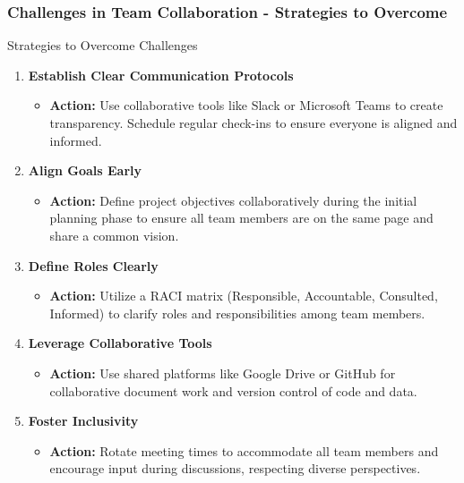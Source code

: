 \documentclass[aspectratio=169]{beamer}
\begin{document}
\begin{frame}[fragile]
    \frametitle{Challenges in Team Collaboration - Strategies to Overcome}
    \begin{block}{Strategies to Overcome Challenges}
        \begin{enumerate}
            \item \textbf{Establish Clear Communication Protocols}
                \begin{itemize}
                    \item \textbf{Action:} Use collaborative tools like Slack or Microsoft Teams to create transparency. Schedule regular check-ins to ensure everyone is aligned and informed.
                \end{itemize}

            \item \textbf{Align Goals Early}
                \begin{itemize}
                    \item \textbf{Action:} Define project objectives collaboratively during the initial planning phase to ensure all team members are on the same page and share a common vision.
                \end{itemize}
                
            \item \textbf{Define Roles Clearly}
                \begin{itemize}
                    \item \textbf{Action:} Utilize a RACI matrix (Responsible, Accountable, Consulted, Informed) to clarify roles and responsibilities among team members.
                \end{itemize}

            \item \textbf{Leverage Collaborative Tools}
                \begin{itemize}
                    \item \textbf{Action:} Use shared platforms like Google Drive or GitHub for collaborative document work and version control of code and data.
                \end{itemize}

            \item \textbf{Foster Inclusivity}
                \begin{itemize}
                    \item \textbf{Action:} Rotate meeting times to accommodate all team members and encourage input during discussions, respecting diverse perspectives.
                \end{itemize}
        \end{enumerate}
    \end{block}
\end{frame}
\end{document}
